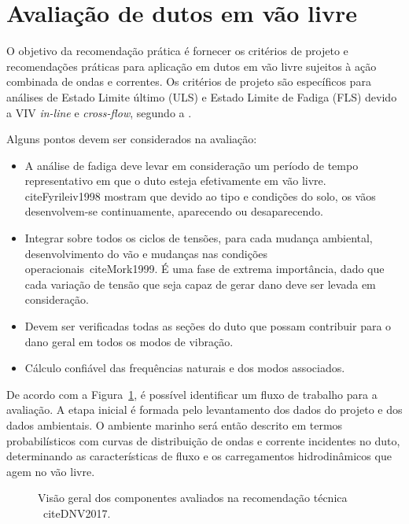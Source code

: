 \section{Avaliação de dutos em vão livre}

O objetivo da recomendação prática  é fornecer os critérios de projeto e recomendações práticas para aplicação em dutos em vão livre sujeitos à ação combinada de ondas e correntes.
Os critérios de projeto são específicos para análises de Estado Limite último (ULS) e Estado Limite de Fadiga (FLS) devido a VIV \textit{in-line} e \textit{cross-flow}, segundo a .

Alguns pontos devem ser considerados na avaliação:
\begin{itemize}
\item A análise de fadiga deve levar em consideração um período de tempo representativo em que o duto esteja efetivamente em vão livre.
cite{Fyrileiv1998} mostram que devido ao tipo e condições do solo, os vãos desenvolvem-se continuamente, aparecendo ou desaparecendo.

\item Integrar sobre todos os ciclos de tensões, para cada mudança ambiental, desenvolvimento do vão e mudanças nas condições operacionais~cite{Mork1999}. É uma fase de extrema importância, dado que cada variação de tensão que seja capaz de gerar dano deve ser levada em consideração.

\item Devem ser verificadas todas as seções do duto que possam contribuir para o dano geral em todos os modos de vibração.

\item Cálculo confiável das frequências naturais e dos modos associados.
\end{itemize}

De acordo com a Figura~\ref{fig:jdsn-dnvchart}, é possível identificar um fluxo de trabalho para a avaliação.
A etapa inicial é formada pelo levantamento dos dados do projeto e dos dados ambientais.
O ambiente marinho será então descrito em termos probabilísticos com curvas de distribuição de ondas e corrente incidentes no duto, determinando as características de fluxo e os carregamentos hidrodinâmicos que agem no vão livre.

\begin{figure}[hbt!]
\begin{center}
\caption{Visão geral dos componentes avaliados na recomendação técnica ~cite{DNV2017}.}
\label{fig:jdsn-dnvchart}
\end{center}
\end{figure}

